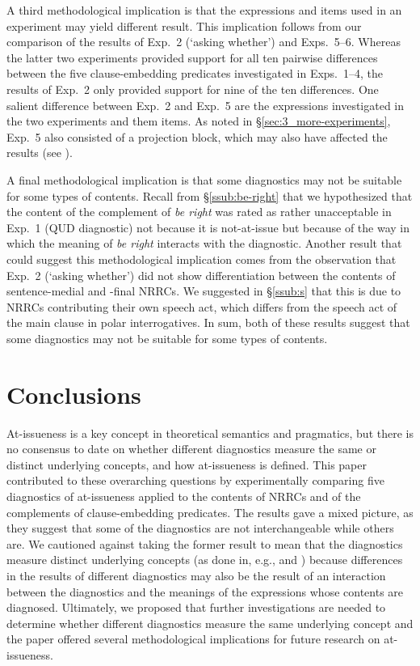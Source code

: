 \documentclass[times,linguex]{glossa}
\begin{document}
A third methodological implication is that the expressions and items used in an experiment may yield different result. This implication follows from our comparison of the results of Exp.~2 (`asking whether') and Exps.~5--6. Whereas the latter two experiments provided support for all ten pairwise differences between the five clause-embedding predicates investigated in Exps.~1--4, the results of Exp.~2 only provided support for nine of the ten differences. One salient difference between Exp.~2 and Exp.~5 are the expressions investigated in the two experiments and them items. As noted in \S\ref{sec:3_more-experiments}, Exp.~5 also consisted of a projection block, which may also have affected the results (see \citealt{degen_projection_2025}).

A final methodological implication is that some diagnostics may not be suitable for some types of contents. Recall from \S\ref{ssub:be-right} that we hypothesized that the content of the complement of \emph{be right} was rated as rather unacceptable in Exp.~1 (QUD diagnostic) not because it is not-at-issue but because of the way in which the meaning of \emph{be right} interacts with the diagnostic. Another result that could suggest this methodological implication comes from the observation that Exp.~2 (`asking whether') did not show differentiation between the contents of sentence-medial and -final NRRCs. We suggested in \S\ref{ssub:s} that this is due to NRRCs contributing their own speech act, which differs from the speech act of the main clause in polar interrogatives. In sum, both of these results suggest that some diagnostics may not be suitable for some types of contents.

\section{Conclusions \label{sec:5_conclusion}}

At-issueness is a key concept in theoretical semantics and pragmatics, but there is no consensus to date on whether different diagnostics measure the same or distinct underlying concepts, and how at-issueness is defined. This paper contributed to these overarching questions by experimentally comparing five diagnostics of at-issueness applied to the contents of NRRCs and of the complements of clause-embedding predicates. The results gave a mixed picture, as they suggest that some of the diagnostics are not interchangeable while others are. We cautioned against taking the former result to mean that the diagnostics measure distinct underlying concepts (as done in, e.g., \citealt{snider_anaphoric_2017} and \citealt{koev_notions_2018}) because differences in the results of different diagnostics may also be the result of an interaction between the diagnostics and the meanings of the expressions whose contents are diagnosed. Ultimately, we proposed that further investigations are needed to determine whether different diagnostics measure the same underlying concept and the paper offered several methodological implications for future research on at-issueness.
\end{document}
